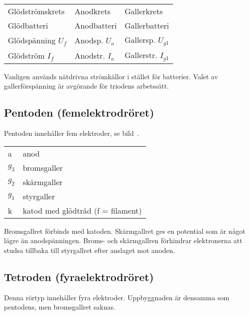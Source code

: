 \begin{center}
\begin{tabular}{lll}
Glödströmskrets      & Anodkrets        &  Gallerkrets \\
Glödbatteri          & Anodbatteri      &  Gallerbatteri \\
Glödspänning \(U_f\) & Anodsp. \(U_a\)  &  Gallersp. \(U_{g1}\) \\
Glödström \(I_f\)    & Anodstr. \(I_a\) &  Gallerstr. \(I_{g1}\) \\
\end{tabular}
\end{center}

\noindent
Vanligen används nätdrivna strömkällor i stället för batterier.
Valet av gallerförspänning är avgörande för triodens arbetssätt.

\subsection{Pentoden (femelektrodröret)}

Pentoden innehåller fem elektroder, se bild~.

\begin{center}
\begin{tabular}{ll}
  a       & anod \\
  \(g_3\) & bromsgaller \\
  \(g_2\) & skärmgaller \\
  \(g_1\) & styrgaller \\
  k      & katod med glödtråd (f = filament) \\
\end{tabular}
\end{center}

Bromsgallret förbinds med katoden. Skärmgallret ges en potential som är något
lägre än anodspänningen.
Broms- och skärmgallren förhindrar elektronerna att studsa tillbaka till
styrgallret efter anslaget mot anoden.

\subsection{Tetroden (fyraelektrodröret)}

Denna rörtyp innehåller fyra elektroder.
Uppbyggnaden är densamma som pentodens, men bromsgallret saknas.


